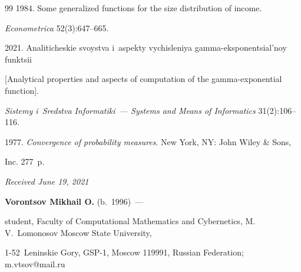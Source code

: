 {{\begin{thebibliography}{99}
 1984. Some generalized functions for the size distribution of income. 


\textit{Econometrica} 52(3):647--665.






 2021. Analiticheskie svoystva i~aspekty vychisleniya gamma-eksponentsial'noy funktsii 


 [Analytical properties and aspects of computation of the gamma-exponential function]. 


 \textit{Sistemy i~Sredstva Informatiki~--- Systems and Means of Informatics} 31(2):106--116.




 1977. \textit{Convergence of probability measures}. New York, NY: John Wiley \& Sons, 


Inc. 277~p.


 \end{thebibliography}


} }





\vspace*{-6pt}





\hfill{\small\textit{Received June 19, 2021}} 





\vspace*{6pt}  








\Contr





\noindent


\textbf{Vorontsov Mikhail O.} (b.\ 1996)~--- 


student, Faculty of Computational Mathematics and Cybernetics, M.\,V.~Lomonosov Moscow State University, 


1-52~Leninskie Gory, GSP-1, Moscow 119991, Russian Federation; \mbox{m.vtsov@mail.ru}





\vspace*{6pt}






